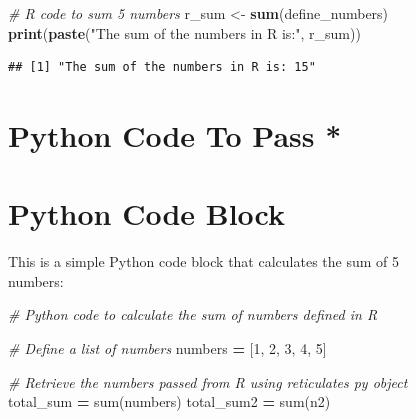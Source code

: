 \documentclass[
  12 pt,
  a4paper,
]{book}
\newenvironment{Shaded}{\begin{snugshade}}{\end{snugshade}}
\newcommand{\BuiltInTok}[1]{#1}
\newcommand{\CommentTok}[1]{\textcolor[rgb]{0.56,0.35,0.01}{\textit{#1}}}
\newcommand{\DecValTok}[1]{\textcolor[rgb]{0.00,0.00,0.81}{#1}}
\newcommand{\FunctionTok}[1]{\textcolor[rgb]{0.13,0.29,0.53}{\textbf{#1}}}
\newcommand{\NormalTok}[1]{#1}
\newcommand{\OperatorTok}[1]{\textcolor[rgb]{0.81,0.36,0.00}{\textbf{#1}}}
\newcommand{\OtherTok}[1]{\textcolor[rgb]{0.56,0.35,0.01}{#1}}
\newcommand{\SpecialCharTok}[1]{\textcolor[rgb]{0.81,0.36,0.00}{\textbf{#1}}}
\newcommand{\StringTok}[1]{\textcolor[rgb]{0.31,0.60,0.02}{#1}}
\numberwithin{equation}{section}
\theoremstyle{plain}      %
\theoremstyle{definition} %
\theoremstyle{remark}     %
\theoremstyle{note}         %
\begin{document}
\begin{figure}
\begin{Shaded}
\begin{Highlighting}[]
\CommentTok{\# R code to sum 5 numbers}
\NormalTok{r\_sum }\OtherTok{\textless{}{-}} \FunctionTok{sum}\NormalTok{(define\_numbers)}
\FunctionTok{print}\NormalTok{(}\FunctionTok{paste}\NormalTok{(}\StringTok{"The sum of the numbers in R is:"}\NormalTok{, r\_sum))}
\end{Highlighting}
\end{Shaded}

\begin{verbatim}
## [1] "The sum of the numbers in R is: 15"
\end{verbatim}

\hypertarget{python-code-to-pass}{%
\section{Python Code To Pass *}\label{python-code-to-pass}}

\begin{Shaded}
\end{Shaded}

\hypertarget{python-code-block}{%
\section{Python Code Block}\label{python-code-block}}

This is a simple Python code block that calculates the sum of 5 numbers:

\begin{Shaded}
\begin{Highlighting}[]
\CommentTok{\# Python code to calculate the sum of numbers defined in R}

\CommentTok{\# Define a list of numbers}
\NormalTok{numbers }\OperatorTok{=}\NormalTok{ [}\DecValTok{1}\NormalTok{, }\DecValTok{2}\NormalTok{, }\DecValTok{3}\NormalTok{, }\DecValTok{4}\NormalTok{, }\DecValTok{5}\NormalTok{]}

\CommentTok{\# Retrieve the numbers passed from R using reticulate\textquotesingle{}s \textquotesingle{}py\textquotesingle{} object}
\NormalTok{total\_sum }\OperatorTok{=} \BuiltInTok{sum}\NormalTok{(numbers)}
\NormalTok{total\_sum2 }\OperatorTok{=} \BuiltInTok{sum}\NormalTok{(n2)}


\end{Highlighting}
\end{Shaded}
\end{figure}
\end{document}
